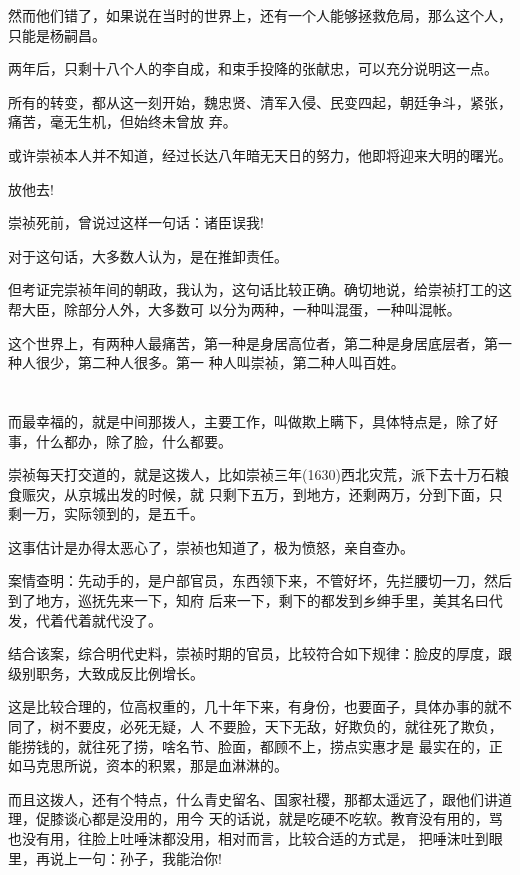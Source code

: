 \documentclass[11pt,a4paper,onecolumn]{article}
\begin{document}
然而他们错了，如果说在当时的世界上，还有一个人能够拯救危局，那么这个人，只能是杨嗣昌。

两年后，只剩十八个人的李自成，和束手投降的张献忠，可以充分说明这一点。

所有的转变，都从这一刻开始，魏忠贤、清军入侵、民变四起，朝廷争斗，紧张，痛苦，毫无生机，但始终未曾放
弃。

或许崇祯本人并不知道，经过长达八年暗无天日的努力，他即将迎来大明的曙光。

放他去!

崇祯死前，曾说过这样一句话：诸臣误我!

对于这句话，大多数人认为，是在推卸责任。

但考证完崇祯年间的朝政，我认为，这句话比较正确。确切地说，给崇祯打工的这帮大臣，除部分人外，大多数可
以分为两种，一种叫混蛋，一种叫混帐。

这个世界上，有两种人最痛苦，第一种是身居高位者，第二种是身居底层者，第一种人很少，第二种人很多。第一
种人叫崇祯，第二种人叫百姓。

\section[\thesection]{}

而最幸福的，就是中间那拨人，主要工作，叫做欺上瞒下，具体特点是，除了好事，什么都办，除了脸，什么都要。

崇祯每天打交道的，就是这拨人，比如崇祯三年(1630)西北灾荒，派下去十万石粮食赈灾，从京城出发的时候，就
只剩下五万，到地方，还剩两万，分到下面，只剩一万，实际领到的，是五千。

这事估计是办得太恶心了，崇祯也知道了，极为愤怒，亲自查办。

案情查明：先动手的，是户部官员，东西领下来，不管好坏，先拦腰切一刀，然后到了地方，巡抚先来一下，知府
后来一下，剩下的都发到乡绅手里，美其名曰代发，代着代着就代没了。

结合该案，综合明代史料，崇祯时期的官员，比较符合如下规律：脸皮的厚度，跟级别职务，大致成反比例增长。

这是比较合理的，位高权重的，几十年下来，有身份，也要面子，具体办事的就不同了，树不要皮，必死无疑，人
不要脸，天下无敌，好欺负的，就往死了欺负，能捞钱的，就往死了捞，啥名节、脸面，都顾不上，捞点实惠才是
最实在的，正如马克思所说，资本的积累，那是血淋淋的。

而且这拨人，还有个特点，什么青史留名、国家社稷，那都太遥远了，跟他们讲道理，促膝谈心都是没用的，用今
天的话说，就是吃硬不吃软。教育没有用的，骂也没有用，往脸上吐唾沫都没用，相对而言，比较合适的方式是，
把唾沫吐到眼里，再说上一句：孙子，我能治你!
\end{document}
